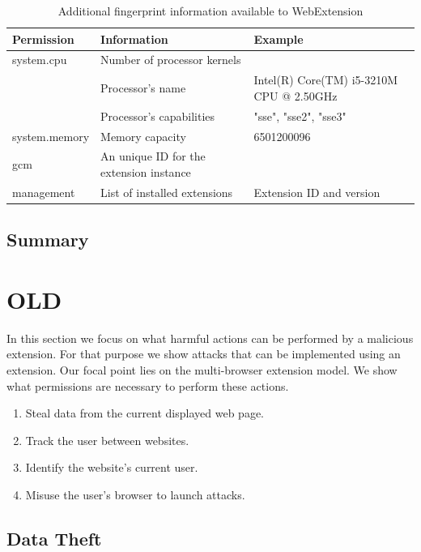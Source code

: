 			\begin{table}[h]
				\begin{tabular}{|l|l|l|} \hline
					\textbf{Permission} & \textbf{Information} & \textbf{Example} \\ \hline
					system.cpu & Number of processor kernels & \\
					& Processor's name & Intel(R) Core(TM) i5-3210M CPU @ 2.50GHz \\
					& Processor's capabilities & "sse", "sse2", "sse3"  \\ \hline
					system.memory & Memory capacity & 6501200096 \\ \hline
					gcm & An unique ID for the extension instance & \\ \hline
					management & List of installed extensions & Extension ID and version \\ \hline
				\end{tabular}
				\caption{Additional fingerprint information available to WebExtension}
				\label{fingerprintExtension}
			\end{table} 
			
	\subsection{Summary}


\section{OLD}

In this section we focus on what harmful actions can be performed by a malicious extension. For that purpose we show attacks that can be implemented using an extension. Our focal point lies on the multi-browser extension model. We show what permissions are necessary to perform these actions. \\ 

\begin{enumerate}
	\item Steal data from the current displayed web page.
	\item Track the user between websites.
	\item Identify the website's current user. 
	\item Misuse the user's browser to launch attacks.
\end{enumerate} 

\subsection{Data Theft}	

